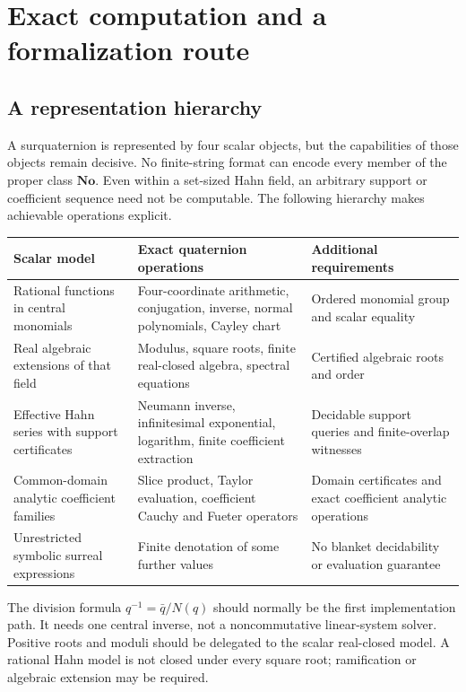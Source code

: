 \documentclass[11pt,letterpaper]{article}
\numberwithin{equation}{section}
\theoremstyle{definition}
\theoremstyle{remark}
\newcommand{\No}{\mathbf{No}}
\begin{document}
\section{Exact computation and a formalization route}\label{sec:computation}

\subsection{A representation hierarchy}
A surquaternion is represented by four scalar objects, but the capabilities of those objects
remain decisive. No finite-string format can encode every member of the proper class $\No$.
Even within a set-sized Hahn field, an arbitrary support or coefficient sequence need not be
computable. The following hierarchy makes achievable operations explicit.

\begin{center}\small
\begin{tabular}{L{0.22\textwidth}L{0.34\textwidth}L{0.34\textwidth}}
\toprule
Scalar model & Exact quaternion operations & Additional requirements\\
\midrule
Rational functions in central monomials & Four-coordinate arithmetic, conjugation, inverse,
normal polynomials, Cayley chart & Ordered monomial group and scalar equality\\
Real algebraic extensions of that field & Modulus, square roots, finite real-closed algebra,
spectral equations & Certified algebraic roots and order\\
Effective Hahn series with support certificates & Neumann inverse, infinitesimal exponential,
logarithm, finite coefficient extraction & Decidable support queries and finite-overlap witnesses\\
Common-domain analytic coefficient families & Slice product, Taylor evaluation, coefficient
Cauchy and Fueter operators & Domain certificates and exact coefficient analytic operations\\
Unrestricted symbolic surreal expressions & Finite denotation of some further values & No
blanket decidability or evaluation guarantee\\
\bottomrule
\end{tabular}
\end{center}

The division formula $q^{-1}=\bar q/N(q)$ should normally be the first implementation path.
It needs one central inverse, not a noncommutative linear-system solver. Positive roots and
moduli should be delegated to the scalar real-closed model. A rational Hahn model is not
closed under every square root; ramification or algebraic extension may be required.
\end{document}
